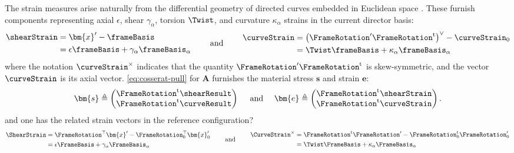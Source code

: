%
The strain measures arise naturally from the differential geometry of
directed curves embedded in Euclidean space
\citep{cosserat1909theorie,ericksen1957exact}. These
furnish components representing axial \(\epsilon\), shear \(\gamma_{\alpha}\), torsion \(\Twist\),
and curvature \(\kappa_{\alpha}\) strains in the current director basis:
%
\begin{equation*} 
  \begin{aligned}
    \shearStrain &= \bm{x}^\prime - \frameBasis \\
    &= \epsilon \frameBasis + \gamma_\alpha\frameBasis_\alpha
  \end{aligned}
  \qquad\text{ and }\qquad
  \begin{aligned}
    \curveStrain &= \left(\FrameRotation^\prime \FrameRotation^\mathrm{t}\right)^{\vee} - \curveStrain_0 \\
    &= \Twist \frameBasis + \kappa_\alpha \frameBasis_{\alpha}
  \end{aligned}
\end{equation*}
%
where the notation \(\curveStrain^{\times}\) indicates that the quantity \(\FrameRotation^{\prime}\FrameRotation^{\mathrm{t}}\) is skew-symmetric, and the vector \(\curveStrain\) is its axial vector. %
\eqref{eq:cosserat-pull} for $\bm{A}$ furnishes the material stress $\bm{s}$ and strain $\bm{e}$:
\begin{equation} 
  \bm{s} \triangleq \begin{pmatrix}\FrameRotation^\mathrm{t}\shearResult\\ \FrameRotation^\mathrm{t}\curveResult\end{pmatrix}
  \quad\text{ and }\quad 
  \bm{e} \triangleq \begin{pmatrix}\FrameRotation^\mathrm{t}\shearStrain\\ \FrameRotation^\mathrm{t}\curveStrain\end{pmatrix}.
\end{equation}
and one has the related strain vectors in the reference configuration?
\begin{equation*} 
  \begin{aligned}
    \ShearStrain &= \tp{\FrameRotation}\bm{x}^\prime - \tp{\FrameRotation_0}\bm{x}_0^{\prime} \\
    &= \epsilon \FrameBasis + \gamma_\alpha\FrameBasis_\alpha
  \end{aligned}
  \qquad\text{ and }\qquad
  \begin{aligned}
    \CurveStrain^{\times} &= \FrameRotation^\mathrm{t}\FrameRotation^\prime - \FrameRotation_0^\mathrm{t}\FrameRotation_0^\prime \\
    &= \Twist \FrameBasis + \kappa_\alpha \FrameBasis_{\alpha}
  \end{aligned}
\end{equation*}

